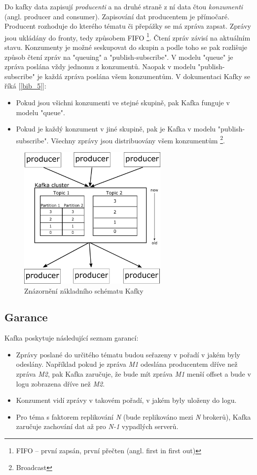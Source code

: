 \documentclass[
  digital, %
  table,   %
  nolof,     %
  nolot,     %
  twoside,
  nocover,
  monochrome,
  12pt
]{fithesis3}
\begin{document}
Do kafky data zapisují \textit{producenti} a na druhé straně z ní data čtou \textit{konzumenti} (angl. producer and consumer). Zapisování dat producentem je přímočaré. Producent rozhoduje do kterého tématu či přepážky se má zpráva zapsat. Zprávy jsou ukládány do fronty, tedy způsobem FIFO \footnote{FIFO -- první zapsán, první přečten (angl. first in first out)}. Čtení zpráv závisí na aktuálním stavu. Konzumenty je možné seskupovat do skupin a podle toho se pak rozlišuje způsob čtení zpráv na "queuing" a "publish-subscribe". V modelu "queue" je zpráva poslána vždy jednomu z konzumentů. Naopak v modelu "publish-subscribe" je každá zpráva poslána všem konzumentům. V dokumentaci Kafky se říká [\ref{bib_5}]:
\begin{itemize}
  \item Pokud jsou všichni konzumenti ve stejné skupině, pak Kafka funguje v modelu "queue".
  \item Pokud je každý konzument v jiné skupině, pak je Kafka v modelu "publish-subscribe". Všechny zprávy jsou distribuovány všem konzumentům \footnote{Broadcast}.
\end{itemize}

\begin{figure}[h]
	\centering
    \includegraphics[width=0.65\textwidth, height=0.45\textheight]{images/kafka.png}
    \caption{Znázornění základního schématu Kafky}
    \label{fig:kafka}
\end{figure}

\subsection*{Garance}
Kafka poskytuje následující seznam garancí:
\begin{itemize}
  \item Zprávy poslané do určitého tématu budou seřazeny v pořadí v jakém byly odeslány. Například pokud je zpráva \textit{M1} odeslána producentem dříve než zpráva \textit{M2}, pak Kafka zaručuje, že bude mít zpráva \textit{M1} menší offset a bude v logu zobrazena dříve než \textit{M2}.
  \item Konzument vidí zprávy v takovém pořadí, v jakém byly uloženy do logu.
   \item Pro téma s faktorem replikování \textit{N} (bude replikováno mezi \textit{N} brokerů), Kafka zaručuje zachování dat až pro \textit{N-1} vypadlých serverů.
\end{itemize}
\end{document}
